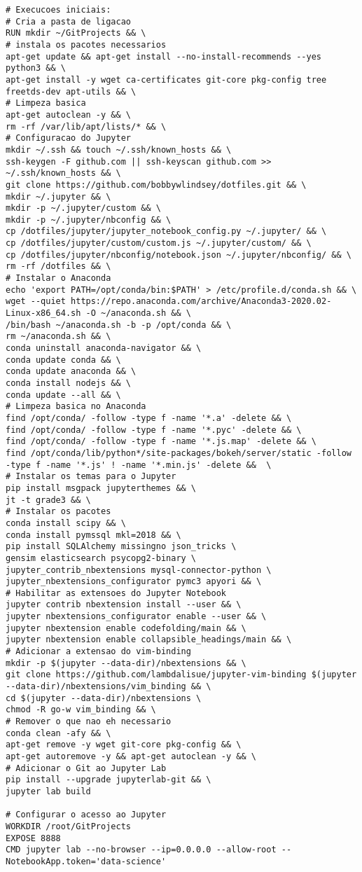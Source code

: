 \begin{lstlisting}[]
# Execucoes iniciais:
# Cria a pasta de ligacao
RUN mkdir ~/GitProjects && \
# instala os pacotes necessarios
apt-get update && apt-get install --no-install-recommends --yes python3 && \
apt-get install -y wget ca-certificates git-core pkg-config tree freetds-dev apt-utils && \
# Limpeza basica
apt-get autoclean -y && \
rm -rf /var/lib/apt/lists/* && \
# Configuracao do Jupyter
mkdir ~/.ssh && touch ~/.ssh/known_hosts && \
ssh-keygen -F github.com || ssh-keyscan github.com >> ~/.ssh/known_hosts && \
git clone https://github.com/bobbywlindsey/dotfiles.git && \
mkdir ~/.jupyter && \
mkdir -p ~/.jupyter/custom && \
mkdir -p ~/.jupyter/nbconfig && \
cp /dotfiles/jupyter/jupyter_notebook_config.py ~/.jupyter/ && \
cp /dotfiles/jupyter/custom/custom.js ~/.jupyter/custom/ && \
cp /dotfiles/jupyter/nbconfig/notebook.json ~/.jupyter/nbconfig/ && \
rm -rf /dotfiles && \
# Instalar o Anaconda
echo 'export PATH=/opt/conda/bin:$PATH' > /etc/profile.d/conda.sh && \
wget --quiet https://repo.anaconda.com/archive/Anaconda3-2020.02-Linux-x86_64.sh -O ~/anaconda.sh && \
/bin/bash ~/anaconda.sh -b -p /opt/conda && \
rm ~/anaconda.sh && \
conda uninstall anaconda-navigator && \
conda update conda && \
conda update anaconda && \
conda install nodejs && \
conda update --all && \
# Limpeza basica no Anaconda
find /opt/conda/ -follow -type f -name '*.a' -delete && \
find /opt/conda/ -follow -type f -name '*.pyc' -delete && \
find /opt/conda/ -follow -type f -name '*.js.map' -delete && \
find /opt/conda/lib/python*/site-packages/bokeh/server/static -follow -type f -name '*.js' ! -name '*.min.js' -delete &&  \
# Instalar os temas para o Jupyter
pip install msgpack jupyterthemes && \
jt -t grade3 && \
# Instalar os pacotes
conda install scipy && \
conda install pymssql mkl=2018 && \
pip install SQLAlchemy missingno json_tricks \
gensim elasticsearch psycopg2-binary \
jupyter_contrib_nbextensions mysql-connector-python \
jupyter_nbextensions_configurator pymc3 apyori && \
# Habilitar as extensoes do Jupyter Notebook
jupyter contrib nbextension install --user && \
jupyter nbextensions_configurator enable --user && \
jupyter nbextension enable codefolding/main && \
jupyter nbextension enable collapsible_headings/main && \
# Adicionar a extensao do vim-binding
mkdir -p $(jupyter --data-dir)/nbextensions && \
git clone https://github.com/lambdalisue/jupyter-vim-binding $(jupyter --data-dir)/nbextensions/vim_binding && \
cd $(jupyter --data-dir)/nbextensions \
chmod -R go-w vim_binding && \
# Remover o que nao eh necessario
conda clean -afy && \
apt-get remove -y wget git-core pkg-config && \
apt-get autoremove -y && apt-get autoclean -y && \
# Adicionar o Git ao Jupyter Lab
pip install --upgrade jupyterlab-git && \
jupyter lab build

# Configurar o acesso ao Jupyter
WORKDIR /root/GitProjects
EXPOSE 8888
CMD jupyter lab --no-browser --ip=0.0.0.0 --allow-root --NotebookApp.token='data-science'
\end{lstlisting}


